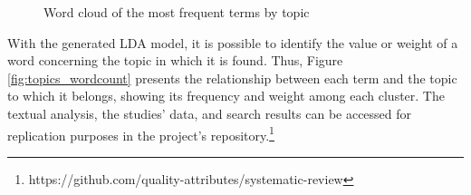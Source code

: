 \documentclass[conference]{IEEEtran}
\begin{document}
\begin{figure}[!htbp]
    \caption{\label{fig:topic_wordcloud}Word cloud of the most frequent terms by topic}
\end{figure}

With the generated LDA model, it is possible to identify the value or weight of a word concerning the topic in which it is found. Thus, Figure \ref{fig:topics_wordcount} presents the relationship between each term and the topic to which it belongs, showing its frequency and weight among each cluster. The textual analysis, the studies' data, and search results can be accessed for replication purposes in the project's repository.\footnote{https://github.com/quality-attributes/systematic-review}
\end{document}
